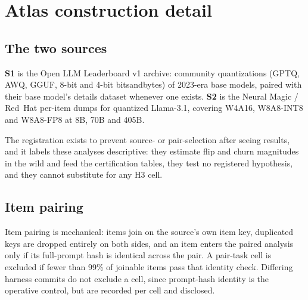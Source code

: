 %

\section{Atlas construction detail}
\label{app:atlas-detail}

\subsection{The two sources}
\label{app:atlas:sources}

\textbf{S1} is the Open LLM Leaderboard v1 archive: community quantizations
(GPTQ, AWQ, GGUF, 8-bit and 4-bit bitsandbytes) of 2023-era base models, paired
with their base model's details dataset whenever one exists. \textbf{S2} is the
Neural Magic / Red~Hat per-item dumps for quantized Llama-3.1, covering W4A16,
W8A8-INT8 and W8A8-FP8 at 8B, 70B and 405B.

The registration exists to prevent source- or pair-selection after seeing
results, and it labels these analyses descriptive: they estimate flip and churn
magnitudes in the wild and feed the certification tables, they test no registered
hypothesis, and they cannot substitute for any H3 cell.

\subsection{Item pairing}
\label{app:atlas:pairing}

Item pairing is mechanical: items join on the source's own item key, duplicated
keys are dropped entirely on both sides, and an item enters the paired analysis
only if its full-prompt hash is identical across the pair. A pair-task cell is
excluded if fewer than 99\% of joinable items pass that identity check. Differing
harness commits do not exclude a cell, since prompt-hash identity is the operative
control, but are recorded per cell and disclosed.

